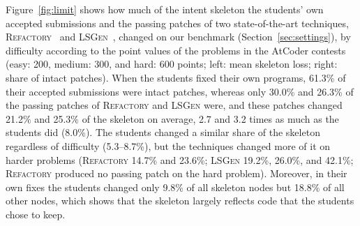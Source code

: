 \documentclass[10pt,conference]{IEEEtran}
\begin{document}
Figure~\ref{fig:limit} shows how much of the intent skeleton the students' own accepted submissions and the passing patches of two state-of-the-art techniques, \textsc{Refactory}~\cite{hu2019re} and \textsc{LSGen}~\cite{dai2026learner}, changed on our benchmark (Section~\ref{sec:settings}), by difficulty according to the point values of the problems in the AtCoder contests (easy: 200, medium: 300, and hard: 600 points; left: mean skeleton loss; right: share of intact patches). When the students fixed their own programs, 61.3\% of their accepted submissions were intact patches, whereas only 30.0\% and 26.3\% of the passing patches of \textsc{Refactory} and \textsc{LSGen} were, and these patches changed 21.2\% and 25.3\% of the skeleton on average, 2.7 and 3.2 times as much as the students did (8.0\%). The students changed a similar share of the skeleton regardless of difficulty (5.3--8.7\%), but the techniques changed more of it on harder problems (\textsc{Refactory} 14.7\% and 23.6\%; \textsc{LSGen} 19.2\%, 26.0\%, and 42.1\%; \textsc{Refactory} produced no passing patch on the hard problem). Moreover, in their own fixes the students changed only 9.8\% of all skeleton nodes but 18.8\% of all other nodes, which shows that the skeleton largely reflects code that the students chose to keep.
\end{document}
